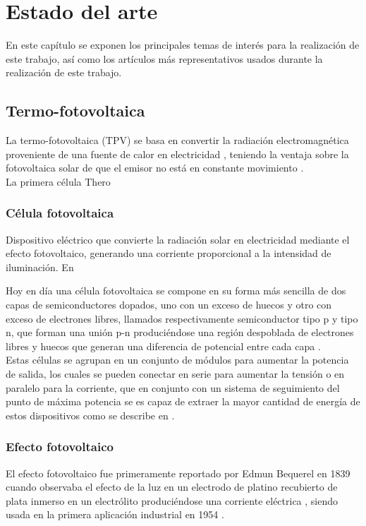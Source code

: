 \chapter{Estado del arte}


En este capítulo se exponen los principales temas de interés para la realización de este trabajo, así como los artículos más representativos usados durante la realización de este trabajo.
\section{Termo-fotovoltaica}
La termo-fotovoltaica (TPV) se basa en convertir la radiación electromagnética proveniente de una fuente de calor en electricidad \cite{ThermophotovolticEnergyConversion_DATAS2021285}, teniendo la ventaja sobre la fotovoltaica solar de que el emisor no está en constante movimiento \cite{ThermophotovolticEnergyConversion_DATAS2021285}.\\

La primera célula Thero
\subsection{Célula fotovoltaica}
Dispositivo eléctrico que convierte la radiación solar en electricidad mediante el efecto fotovoltaico, generando una corriente proporcional a la intensidad de iluminación. En 

Hoy en día una célula fotovoltaica se compone en su forma más sencilla de dos capas de semiconductores dopados, uno con un exceso de huecos y otro con exceso de electrones libres, llamados respectivamente semiconductor tipo p y tipo n, que forman una unión p-n produciéndose una región despoblada de electrones libres y huecos que generan una diferencia de potencial entre cada capa \cite{PhotovoltaicCell_FullDescription_EstadoDelArte_KHALIGH2018725}.\\

Estas células se agrupan en un conjunto de módulos para aumentar la potencia de salida, los cuales se pueden conectar en serie para aumentar la tensión o en paralelo para la corriente, que en conjunto con un sistema de seguimiento del punto de máxima potencia se es capaz de extraer la mayor cantidad de energía de estos dispositivos como se describe en \cite{PhotovoltaicCell_FullDescription_EstadoDelArte_KHALIGH2018725}.
\subsection{Efecto fotovoltaico}
El efecto fotovoltaico fue primeramente reportado por Edmun Bequerel en 1839 cuando observaba el efecto de la luz en un electrodo de platino recubierto de plata inmerso en un electrólito produciéndose una corriente eléctrica \cite{PhotovoltaicEffect_History_SUDHAKAR2018117}, siendo usada en la primera aplicación industrial en 1954 \cite{PhotovoltaicEffect_History_IndustrialUse_DINCER2018707} .%


